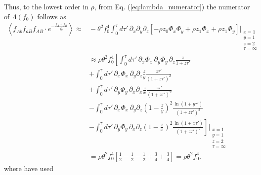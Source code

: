 \documentclass[11pt]{article}
\begin{document}
Thus, to the lowest order in $\rho$, from Eq. (\ref{eq:lambda_numerator}) the numerator of $\Lambda(f_0)$ follows as
\begin{align}\label{eq:lambda_num_contribution}
    \left\langle f_{Ab}f_{aB}f_{AB}\cdot e^{-\frac{f_{A}+f_{B}}{f_0}}\right\rangle \approx&{} 
    -\theta^2 f_0^4 \int_0^{\tau} d\tau'\, \partial_x\partial_y\partial_z \left[-\rho z_0\Phi_x\Phi_y + \rho z_1\Phi_x + \rho z_1\Phi_y\right]\Bigg\vert_{\substack{x=1 \\ y=1 \\ z=2 \\ \tau=\infty}} \\ \nonumber
    &\approx \rho \theta^2 f_0^4 \left[
    \int_0^{\tau} d\tau'\, \partial_x \Phi_x \, \partial_y \Phi_y \, \partial_z \frac{z}{1+z\tau'} \right. \\\nonumber
    &+ \left. \int_0^{\tau} d\tau'\, \partial_x \Phi_x \, \partial_y \partial_z \frac{z}{y} \frac{z\tau'}{(1+z\tau')^2} \right. \\\nonumber
    &+ \left. \int_0^{\tau} d\tau'\, \partial_y \Phi_y \, \partial_x \partial_x \frac{z}{x} \frac{z\tau'}{(1+z\tau')^2} \right. \\\nonumber
    &- \left. \int_0^{\tau} d\tau'\, \partial_x \Phi_x \, \partial_y \partial_z \left(1-\frac{z}{y}\right)^2 \frac{\ln(1+y\tau')}{(1+z\tau')^2} \right. \\\nonumber
    &- \left. \int_0^{\tau} d\tau'\, \partial_y \Phi_y \, \partial_x \partial_z \left(1-\frac{z}{x}\right)^2 \frac{\ln(1+x\tau')}{(1+z\tau')^2} 
    \right]\Bigg\vert_{\substack{x=1 \\ y=1 \\ z=2 \\ \tau=\infty}} \\ \nonumber
    &= \rho \theta^2 f_0^4 \left[\frac{1}{2} -\frac{1}{2} -\frac{1}{2} +\frac{3}{4} +\frac{3}{4}\right] = \rho \theta^2 f_0^4.
\end{align}
where have used 
\end{document}

